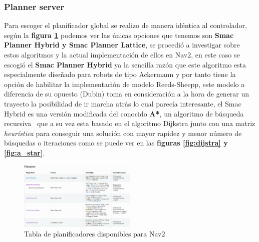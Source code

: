 \subsubsection{Planner server} 
Para escoger el planificador global se realizo de manera idéntica al controlador, según la \textbf{figura \ref{fig:planificadores_tabla}} podemos ver las únicas opciones que tenemos son 
\textbf{Smac Planner Hybrid y Smac Planner Lattice}, se procedió a investigar sobre estos algoritmos y la actual implementación de ellos en Nav2, en este caso se escogió 
el \textbf{Smac Planner Hybrid} ya la sencilla razón que este algoritmo esta especialmente diseñado para robots de tipo Ackermann y por tanto tiene la opción de habilitar 
la implementación de modelo Reeds-Sheepp, este modelo a diferencia de su opuesto (Dubin) toma en consideración a la hora de generar 
un trayecto la posibilidad de ir marcha atrás lo cual parecía interesante, el Smac Hybrid es una versión modificada 
del conocido \textbf{A*}, un algoritmo de búsqueda recursiva~\cite{dolgov2008practical} que a su vez esta basado en el algoritmo Dijkstra junto con una matriz 
\textit{heurística} para conseguir una solución con mayor rapidez y menor número de búsquedas o iteraciones como se puede ver en las 
\textbf{figuras \ref{fig:dijstra} y \ref{fig:a_star}}. 
\begin{figure}[H]
    \centering
    \includegraphics[width=0.5\textwidth]{images/planificadores_table.png}
    \caption{Tabla de planificadores disponibles para Nav2}
    \label{fig:planificadores_tabla}
\end{figure}

